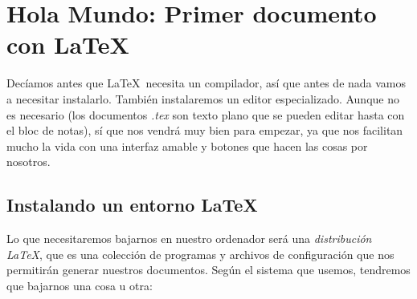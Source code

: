 \section{Hola Mundo: Primer documento con \LaTeX}

Decíamos antes que \LaTeX\ necesita un compilador, así que antes de nada vamos a necesitar instalarlo. También instalaremos un editor especializado. Aunque no es necesario (los documentos \textit{.tex} son texto plano que se pueden editar hasta con el bloc de notas), sí que nos vendrá muy bien para empezar, ya que nos facilitan mucho la vida con una interfaz amable y botones que hacen las cosas por nosotros.

\subsection{Instalando un entorno \LaTeX}

Lo que necesitaremos bajarnos en nuestro ordenador será una \textit{distribución \LaTeX}, que es una colección de programas y archivos de configuración que nos permitirán generar nuestros documentos. Según el sistema que usemos, tendremos que bajarnos una cosa u otra:


